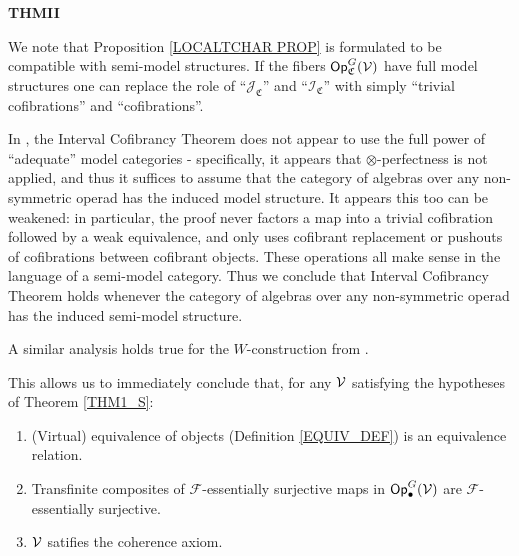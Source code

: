 \documentclass[a4paper,10pt
]{article}%
\renewcommand{\F}{\mathcal F}
\renewcommand{\1}{\eta}%
\begin{document}


\textbf{THMII}


We note that Proposition \ref{LOCALTCHAR PROP} is formulated to be compatible with semi-model structures.
If the fibers $\mathsf{Op}^G_{\mathfrak{C}}(\mathcal V)$ have full model structures one can replace the role of
``$\mathcal{J}_{\mathfrak{C}}$'' and ``$\mathcal{I}_{\mathfrak{C}}$''
with simply ``trivial cofibrations'' and ``cofibrations''.


\begin{remark}
	In \cite{BM13}, the Interval Cofibrancy Theorem does not appear to use the full power of ``adequate'' model categories -
	specifically, it appears that $\otimes$-perfectness is not applied,
	and thus it suffices to assume that the category of algebras over any non-symmetric operad has the induced model structure.
	It appears this too can be weakened:
	in particular, the proof never factors a map into a trivial cofibration followed by a weak equivalence,
	and only uses cofibrant replacement or pushouts of cofibrations between cofibrant objects.
	These operations all make sense in the language of a semi-model category.
	Thus we conclude that Interval Cofibrancy Theorem holds whenever the category of algebras over any non-symmetric operad has the induced semi-model structure. 
	
	A similar analysis holds true for the $W$-construction from \cite{BM06}.
	
	This allows us to immediately conclude that, for any $\mathcal V$ satisfying the hypotheses of Theorem \ref{THM1_S}:
	\begin{enumerate}[label=(\roman*)]
		\item (Virtual) equivalence of objects (Definition \ref{EQUIV_DEF}) is an equivalence relation.
		\item Transfinite composites of $\F$-essentially surjective maps in $\mathsf{Op}^G_\bullet(\mathcal V)$ are $\F$-essentially surjective.
		\item $\mathcal V$ satifies the coherence axiom.
	\end{enumerate}
\end{remark}
\end{document}
